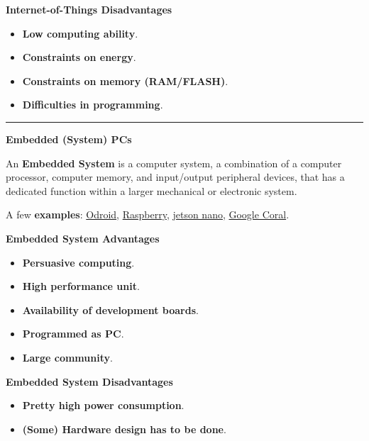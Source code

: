 \documentclass[a4paper]{article}
\newcommand{\longline}{\noindent\rule{\textwidth}{0.4pt}}
\newcommand{\definition}[1]{\textcolor{Red3}{\textbf{#1}}\index{#1}}
\newcommand{\example}[1]{\textcolor{Green4}{\textbf{#1}}}
\newcommand{\highspace}{\vspace{1.2em}\noindent}
\begin{document}
    \begin{flushleft}
        \textcolor{Red2}{ \textbf{Internet-of-Things Disadvantages}}
    \end{flushleft}
    \begin{itemize}
        \item \textbf{Low computing ability}.
        \item \textbf{Constraints on energy}.
        \item \textbf{Constraints on memory (RAM/FLASH)}.
        \item \textbf{Difficulties in programming}.
    \end{itemize}

    \longline

    \begin{center}
        \large
        \textcolor{Red3}{\textbf{Embedded (System) PCs}}
    \end{center}

    \noindent
    An \definition{Embedded System} is a computer system, a combination of a computer processor, computer memory, and input/output peripheral devices, that has a dedicated function within a larger mechanical or electronic system.

    \highspace
    A few \example{examples}: \href{https://www.hardkernel.com/}{Odroid}, \href{https://www.raspberrypi.com/}{Raspberry}, \href{https://developer.nvidia.com/embedded/jetson-nano}{jetson nano}, \href{https://www.coral.ai/}{Google Coral}.

    \begin{flushleft}
        \textcolor{Green3}{ \textbf{Embedded System Advantages}}
    \end{flushleft}
    \begin{itemize}
        \item \textbf{Persuasive computing}.
        \item \textbf{High performance unit}.
        \item \textbf{Availability of development boards}.
        \item \textbf{Programmed as PC}.
        \item \textbf{Large community}.
    \end{itemize}

    \begin{flushleft}
        \textcolor{Red2}{ \textbf{Embedded System Disadvantages}}
    \end{flushleft}
    \begin{itemize}
        \item \textbf{Pretty high power consumption}.
        \item \textbf{(Some) Hardware design has to be done}.
    \end{itemize}
\end{document}
